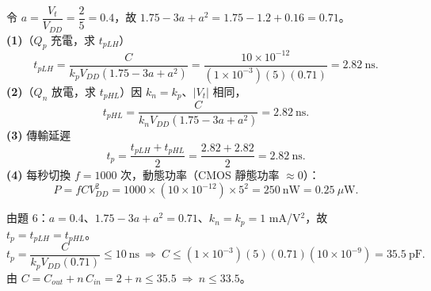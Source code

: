 \documentclass[12pt]{article}
\begin{document}
\sol 令 $a=\dfrac{V_t}{V_{DD}}=\dfrac{2}{5}=0.4$，故 $1.75-3a+a^2=1.75-1.2+0.16=0.71$。\\
\textbf{(1)}（$Q_p$ 充電，求 $t_{pLH}$）
\[ t_{pLH}=\frac{C}{k_pV_{DD}(1.75-3a+a^2)}
   =\frac{10\times10^{-12}}{(1\times10^{-3})(5)(0.71)}=2.82\ \text{ns}. \]
\textbf{(2)}（$Q_n$ 放電，求 $t_{pHL}$）因 $k_n=k_p$、$|V_t|$ 相同，
\[ t_{pHL}=\frac{C}{k_nV_{DD}(1.75-3a+a^2)}=2.82\ \text{ns}. \]
\textbf{(3)} 傳輸延遲
\[ t_p=\frac{t_{pLH}+t_{pHL}}{2}=\frac{2.82+2.82}{2}=2.82\ \text{ns}. \]
\textbf{(4)} 每秒切換 $f=1000$ 次，動態功率（CMOS 靜態功率 $\approx0$）：
\[ P=fCV_{DD}^2=1000\times(10\times10^{-12})\times5^2=250\ \text{nW}=0.25\ \mu\text{W}. \]

\sol 由題 6：$a=0.4$、$1.75-3a+a^2=0.71$、$k_n=k_p=1$ mA/V$^2$，故 $t_p=t_{pLH}=t_{pHL}$。
\[ t_p=\frac{C}{k_pV_{DD}(0.71)}\le10\ \text{ns}
   \ \Rightarrow\ C\le (1\times10^{-3})(5)(0.71)(10\times10^{-9})=35.5\ \text{pF}. \]
由 $C=C_{out}+n\,C_{in}=2+n\le35.5\ \Rightarrow\ n\le33.5$。

\begin{minipage}{0.60\linewidth}
\end{minipage}\hfill
\begin{minipage}{0.37\linewidth}
\end{minipage}
\end{document}
